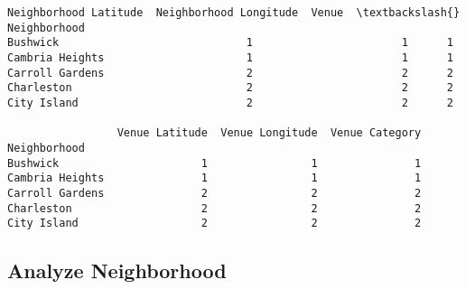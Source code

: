 \documentclass[11pt]{article}
\makeatletter
\newcommand{\boxspacing}{\kern\kvtcb@left@rule\kern\kvtcb@boxsep}
\newcommand{\prompt}[4]{
        \ttfamily\llap{{\color{#2}[#3]:\hspace{3pt}#4}}\vspace{-\baselineskip}
    }
\makeatother
\begin{document}
            \begin{tcolorbox}[breakable, size=fbox, boxrule=.5pt, pad at break*=1mm, opacityfill=0]
\prompt{Out}{outcolor}{44}{\boxspacing}
\begin{Verbatim}[commandchars=\\\{\}]
                 Neighborhood Latitude  Neighborhood Longitude  Venue  \textbackslash{}
Neighborhood
Bushwick                             1                       1      1
Cambria Heights                      1                       1      1
Carroll Gardens                      2                       2      2
Charleston                           2                       2      2
City Island                          2                       2      2

                 Venue Latitude  Venue Longitude  Venue Category
Neighborhood
Bushwick                      1                1               1
Cambria Heights               1                1               1
Carroll Gardens               2                2               2
Charleston                    2                2               2
City Island                   2                2               2
\end{Verbatim}
\end{tcolorbox}
        
    \hypertarget{analyze-neighborhood}{%
\subsection{Analyze Neighborhood}\label{analyze-neighborhood}}
\end{document}
